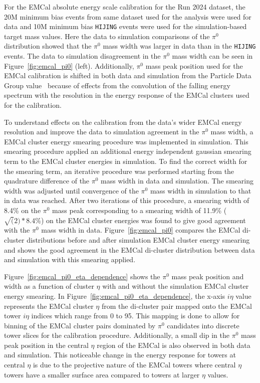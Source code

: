 For the EMCal absolute energy scale calibration for the Run 2024 \auau{} dataset, the 20M minimum bias events from same dataset used for the \detdeta analysis were used for data and 10M minimum bias \texttt{HIJING} events were used for the simulation-based target mass values.
Here the data to simulation comparisons of the $\pi^{0}$ distribution showed that the $\pi^{0}$ mass width was larger in data than in the \texttt{HIJING} events.
The data to simulation disagreement in the $\pi^{0}$ mass width can be seen in Figure~\ref{fig:emcal_pi0} (left).
Additionally, $\pi^{0}$ mass peak position used for the EMCal calibration is shifted in both data and simulation from the Particle Data Group value~\cite{ParticleDataGroup:2024cfk} because of effects from the convolution of the falling energy spectrum with the resolution in the energy response of the EMCal clusters used for the calibration.

To understand effects on the calibration from the data's wider EMCal energy resolution and improve the data to simulation agreement in the $\pi^{0}$ mass width, a EMCal cluster energy smearing procedure was implemented in simulation.
This smearing procedure applied an additional energy independent gaussian smearing term to the EMCal cluster energies in simulation.
To find the correct width for the smearing term, an iterative procedure was performed starting from the quadrature difference of the $\pi^{0}$ mass width in data and simulation.
The smearing width was adjusted until convergence of the $\pi^{0}$ mass width in simulation to that in data was reached.
After two iterations of this procedure, a smearing width of 8.4\% on the $\pi^{0}$ mass peak corresponding to a smearing width of 11.9\% ($\sqrt(2)*8.4\%$) on the EMCal cluster energies was found to give good agreement with the $\pi^{0}$ mass width in data.
Figure~\ref{fig:emcal_pi0} compares the EMCal di-cluster distributions before and after simulation EMCal cluster energy smearing and shows the good agreement in the EMCal di-cluster distribution between data and simulation with this smearing applied.

Figure~\ref{fig:emcal_pi0_eta_dependence} shows the $\pi^{0}$ mass peak position and width as a function of cluster $\eta$ with and without the simulation EMCal cluster energy smearing.
In Figure~\ref{fig:emcal_pi0_eta_dependence}, the x-axis $i\eta$ value represents the EMCal cluster $\eta$ from the di-cluster pair mapped onto the EMCal tower $i\eta$ indices which range from 0 to 95.
This mapping is done to allow for binning of the EMCal cluster pairs dominated by $\pi^{0}$ candidates into discrete tower slices for the calibration procedure.
Additionally, a small dip in the $\pi^{0}$ mass peak position in the central $\eta$ region of the EMCal is also observed in both data and simulation.
This noticeable change in the energy response for towers at central $\eta$ is due to the projective nature of the EMCal towers where central $\eta$ towers have a smaller surface area compared to towers at larger $\eta$ values. 

